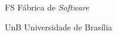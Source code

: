 \begin{siglas}
  \item[FS] Fábrica de \textit{Software}
  \item[UnB] Universidade de Brasília
\end{siglas}
